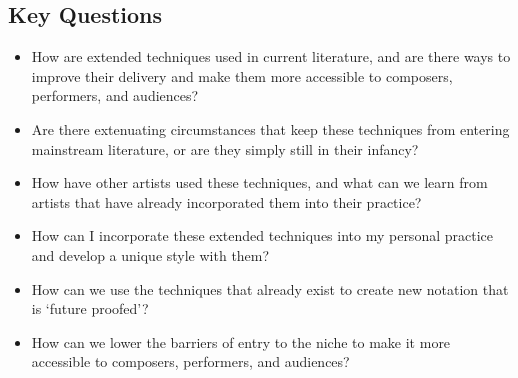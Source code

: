 \subsection{Key Questions}
\begin{itemize}
    \item How are extended techniques used in current literature, and are there ways to improve their delivery and make them more accessible to composers, performers, and audiences?
    \item Are there extenuating circumstances that keep these techniques from entering mainstream literature, or are they simply still in their infancy? 
    \item How have other artists used these techniques, and what can we learn from artists that have already incorporated them into their practice?
    \item How can I incorporate these extended techniques into my personal practice and develop a unique style with them?
    \item How can we use the techniques that already exist to create new notation that is `future proofed'?
    \item How can we lower the barriers of entry to the niche to make it more accessible to composers, performers, and audiences?
\end{itemize}